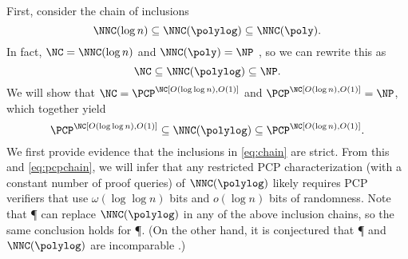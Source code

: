 \documentclass{article}
\newcommand{\loglog}{\log \log}
\begin{document}
First, consider the chain of inclusions
\begin{equation*}
  \NNC(\log n) \subseteq \NNC(\polylog) \subseteq \NNC(\poly).
\end{equation*}
In fact, $\NC = \NNC(\log n)$ and $\NNC(\poly) = \NP$ \cite{wolf94}, so we can rewrite this as
\begin{equation}\label{eq:chain}
  \NC \subseteq \NNC(\polylog) \subseteq \NP.
\end{equation}
We will show that $\NC = \PCP^\NC[O(\loglog n), O(1)]$ and $\PCP^\NC[O(\log n), O(1)] = \NP$, which together yield
\begin{equation}\label{eq:pcpchain}
  \PCP^\NC[O(\loglog n), O(1)] \subseteq \NNC(\polylog) \subseteq \PCP^\NC[O(\log n), O(1)].
\end{equation}
We first provide evidence that the inclusions in \autoref{eq:chain} are strict.
From this and \autoref{eq:pcpchain}, we will infer that any restricted PCP characterization (with a constant number of proof queries) of $\NNC(\polylog)$ likely requires PCP verifiers that use $\omega(\loglog n)$ bits and $o(\log n)$ bits of randomness. Note that \P{} can replace $\NNC(\polylog)$ in any of the above inclusion chains, so the same conclusion holds for \P.
(On the other hand, it is conjectured that \P{} and $\NNC(\polylog)$ are incomparable \cite{wolf94}.)
\end{document}
